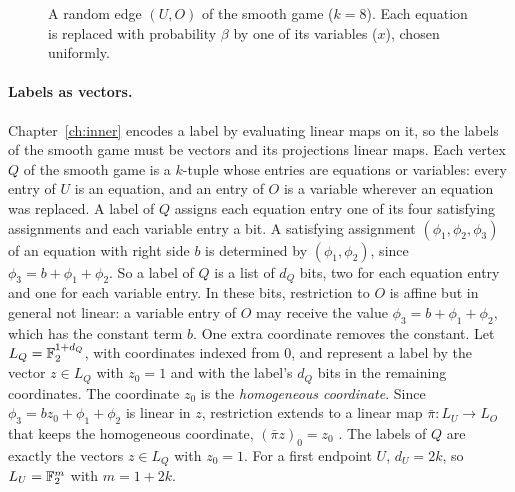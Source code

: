 \begin{figure}[ht]
\centering
{}
\caption{A random edge $(U,O)$ of the smooth game ($k=8$). Each equation is replaced with probability $\beta$ by one of its variables ($x$), chosen uniformly.}\label{fig:smooth}
\end{figure}

\paragraph{Labels as vectors.}\label{nt:labels} Chapter~\ref{ch:inner} encodes a label by evaluating linear maps on it, so the labels of the smooth game must be vectors and its projections linear maps. Each vertex $Q$ of the smooth game is a $k$-tuple whose entries are equations or variables: every entry of $U$ is an equation, and an entry of $O$ is a variable wherever an equation was replaced. A label of $Q$ assigns each equation entry one of its four satisfying assignments and each variable entry a bit. A satisfying assignment $(\phi_1,\phi_2,\phi_3)$ of an equation with right side $b$ is determined by $(\phi_1,\phi_2)$, since $\phi_3=b+\phi_1+\phi_2$. So a label of $Q$ is a list of $d_Q$ bits, two for each equation entry and one for each variable entry. In these bits, restriction to $O$ is affine but in general not linear: a variable entry of $O$ may receive the value $\phi_3=b+\phi_1+\phi_2$, which has the constant term $b$. One extra coordinate removes the constant. Let $L_Q=\mathbb{F}_2^{1+d_Q}$, with coordinates indexed from $0$, and represent a label by the vector $z\in L_Q$ with $z_0=1$ and with the label's $d_Q$ bits in the remaining coordinates. The coordinate $z_0$ is the \emph{homogeneous coordinate}. Since $\phi_3=bz_0+\phi_1+\phi_2$ is linear in $z$, restriction extends to a linear map $\bar\pi:L_U\to L_O$ that keeps the homogeneous coordinate, $(\bar\pi z)_0=z_0$ \cite[Section~4.2]{OAI}. The labels of $Q$ are exactly the vectors $z\in L_Q$ with $z_0=1$. For a first endpoint $U$, $d_U=2k$, so $L_U=\mathbb{F}_2^m$ with $m=1+2k$.

